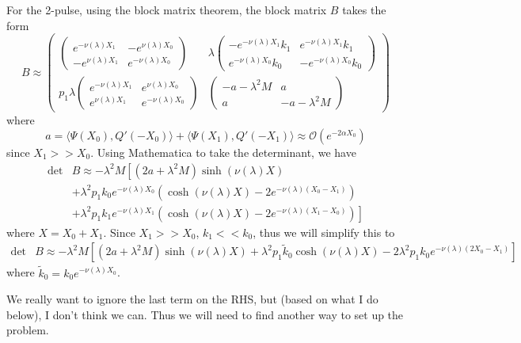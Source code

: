 \documentclass[thesis.tex]{subfiles}
\begin{document}
For the 2-pulse, using the block matrix theorem, the block matrix $B$ takes the form
\[
B \approx \begin{pmatrix}
\begin{pmatrix}
e^{-\nu(\lambda)X_1} & -e^{\nu(\lambda)X_0} \\
-e^{\nu(\lambda)X_1} & e^{-\nu(\lambda)X_0} 
\end{pmatrix} &
\lambda \begin{pmatrix}
-e^{-\nu(\lambda)X_1} k_1 & e^{-\nu(\lambda)X_1} k_1 \\ e^{-\nu(\lambda)X_0} k_0 & -e^{-\nu(\lambda)X_0} k_0
\end{pmatrix} \\
p_1 \lambda
\begin{pmatrix}
e^{-\nu(\lambda)X_1} & e^{\nu(\lambda)X_0} \\
e^{\nu(\lambda)X_1} & e^{-\nu(\lambda)X_0} 
\end{pmatrix} &
\begin{pmatrix}
-a - \lambda^2 M & a \\
a & -a - \lambda^2 M
\end{pmatrix}
\end{pmatrix}
\]
where
\[
a = \langle \Psi(X_0), Q'(-X_0) \rangle
+ \langle \Psi(X_1), Q'(-X_1) \rangle \approx \mathcal{O}(e^{-2\alpha X_0})
\]
since $X_1 >> X_0$. Using Mathematica to take the determinant, we have
\begin{align*}
\det &B \approx -\lambda^2 M \left[ (2a + \lambda^2 M) \sinh(\nu(\lambda)X) \right. \\
&+ \left. \lambda^2 p_1 k_0 e^{-\nu(\lambda) X_0}\left( \cosh (\nu(\lambda) X) - 2 e^{-\nu(\lambda) (X_0 - X_1) } \right) \right. \\
&+ \left. \lambda^2 p_1 k_1 e^{-\nu(\lambda) X_1}\left( \cosh (\nu(\lambda) X) - 2 e^{-\nu(\lambda) (X_1 - X_0) } \right) \right] 
\end{align*}
where $X = X_0 + X_1$. Since $X_1 >> X_0$, $k_1 << k_0$, thus we will simplify this to 
\begin{align*}
\det &B \approx -\lambda^2 M \left[ (2a + \lambda^2 M) \sinh(\nu(\lambda)X) + \lambda^2 p_1 \tilde{k}_0 \cosh (\nu(\lambda) X) - 2 \lambda^2 p_1 k_0 e^{-\nu(\lambda) (2 X_0 - X_1) } \right] 
\end{align*}
where $\tilde{k}_0 = k_0 e^{-\nu(\lambda) X_0}$. 

We really want to ignore the last term on the RHS, but (based on what I do below), I don't think we can. Thus we will need to find another way to set up the problem.
\end{document}
